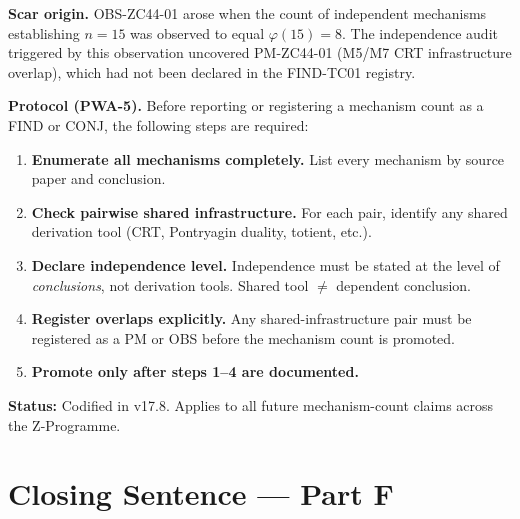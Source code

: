 \documentclass[12pt, a4paper]{article}
\begin{document}
\begin{keybox}[title={PWA-5: Enumerate and Independence-Check
  Before Reporting Mechanism Count (v17.8 addition)}]
\textbf{Scar origin.}
OBS-ZC44-01 arose when the count of independent mechanisms
establishing $n = 15$ was observed to equal $\varphi(15) = 8$.
The independence audit triggered by this observation uncovered
PM-ZC44-01 (M5/M7 CRT infrastructure overlap), which had not
been declared in the FIND-TC01 registry.

\textbf{Protocol (PWA-5).}
Before reporting or registering a mechanism count as a
FIND or CONJ, the following steps are required:
\begin{enumerate}[leftmargin=*, noitemsep, itemsep=3pt]
\item \textbf{Enumerate all mechanisms completely.}
  List every mechanism by source paper and conclusion.
\item \textbf{Check pairwise shared infrastructure.}
  For each pair, identify any shared derivation tool
  (CRT, Pontryagin duality, totient, etc.).
\item \textbf{Declare independence level.}
  Independence must be stated at the level of
  \emph{conclusions}, not derivation tools.
  Shared tool $\neq$ dependent conclusion.
\item \textbf{Register overlaps explicitly.}
  Any shared-infrastructure pair must be registered as a
  PM or OBS before the mechanism count is promoted.
\item \textbf{Promote only after steps 1--4 are documented.}
\end{enumerate}

\textbf{Status:} Codified in v17.8. Applies to all future
mechanism-count claims across the Z-Programme.
\end{keybox}

\newpage


\section*{Closing Sentence --- Part F}
\end{document}
